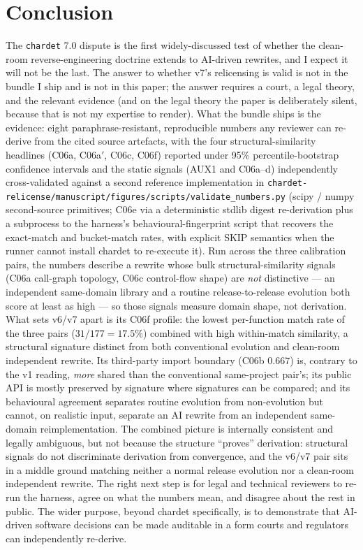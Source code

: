 \documentclass[11pt,letterpaper]{article}
\begin{document}
\section{Conclusion}
\label{sec:conclusion}

The \texttt{chardet} 7.0 dispute is the first widely-discussed
test of whether the clean-room reverse-engineering doctrine
extends to AI-driven rewrites, and I expect it will not be the
last. The answer to whether v7's relicensing is valid is not in
the bundle I ship and is not in this paper; the answer requires a
court, a legal theory, and the relevant evidence (and on the
legal theory the paper is deliberately silent, because that is not
my expertise to render). What the bundle ships is the evidence:
eight paraphrase-resistant, reproducible numbers any reviewer can
re-derive from the cited source artefacts, with the four
structural-similarity headlines (C06a, C06a$'$, C06c, C06f)
reported under 95\% percentile-bootstrap confidence intervals and
the static signals (AUX1 and C06a--d) independently cross-validated
against a second reference implementation in \texttt{chardet-relicense/manuscript/figures/scripts/validate\_numbers.py}
(scipy / numpy second-source primitives; C06e
via a deterministic stdlib digest re-derivation plus a subprocess
to the harness's behavioural-fingerprint script that recovers the
exact-match and bucket-match rates, with explicit SKIP semantics
when the runner cannot install chardet to re-execute it).
Run across the three calibration pairs, the numbers describe a
rewrite whose bulk structural-similarity signals (C06a call-graph
topology, C06c control-flow shape) are \emph{not} distinctive ---
an independent same-domain library and a routine release-to-release
evolution both score at least as high --- so those signals measure
domain shape, not derivation. What sets v6/v7 apart is its C06f
profile: the lowest per-function match rate of the three pairs
($31/177=17.5\%$) combined with high within-match similarity, a structural
signature distinct from both conventional evolution and clean-room
independent rewrite. Its third-party import boundary (C06b
$0.667$) is, contrary to the v1 reading, \emph{more} shared than
the conventional same-project pair's; its public API is mostly
preserved by signature where signatures can be compared; and its
behavioural agreement separates routine evolution from
non-evolution but cannot, on realistic input, separate an AI
rewrite from an independent same-domain reimplementation. The
combined picture is internally consistent and legally ambiguous,
but not because the structure ``proves'' derivation: structural
signals do not discriminate derivation from convergence, and the
v6/v7 pair sits in a middle ground matching neither a normal
release evolution nor a clean-room independent rewrite. The
right next step is for legal and technical reviewers to re-run the
harness, agree on what the numbers mean, and disagree about the
rest in public. The wider purpose, beyond chardet specifically, is
to demonstrate that AI-driven software decisions can be made
auditable in a form courts and regulators can independently
re-derive.
\end{document}
